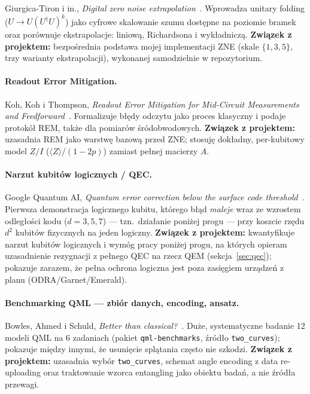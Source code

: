 \documentclass[11pt,a4paper]{article}
\begin{document}
Giurgica-Tiron i in., \emph{Digital zero noise extrapolation}~\cite{giurgica2020}. Wprowadza
unitary folding ($U \to U(U^{\dagger}U)^k$) jako cyfrowe skalowanie szumu dostępne na poziomie
bramek oraz porównuje ekstrapolacje: liniową, Richardsona i wykładniczą. \textbf{Związek
z projektem:} bezpośrednia podstawa mojej implementacji ZNE (skale $\{1,3,5\}$, trzy warianty
ekstrapolacji), wykonanej samodzielnie w repozytorium.

\paragraph{Readout Error Mitigation.}
Koh, Koh i Thompson, \emph{Readout Error Mitigation for Mid-Circuit Measurements and
Feedforward}~\cite{koh2024}. Formalizuje błędy odczytu jako proces klasyczny i podaje protokół
REM, także dla pomiarów
śródobwodowych. \textbf{Związek z projektem:} uzasadnia REM jako warstwę bazową przed ZNE;
stosuję dokładny, per-kubitowy model $Z/I$ ($\langle Z\rangle/(1-2p)$) zamiast pełnej
macierzy $A$.

\paragraph{Narzut kubitów logicznych / QEC.}
Google Quantum AI, \emph{Quantum error correction below the surface code
threshold}~\cite{googleqec2025}. Pierwsza demonstracja logicznego kubitu, którego błąd
\emph{maleje} wraz ze wzrostem odległości kodu ($d=3,5,7$) --- tzn.\ działanie poniżej progu
--- przy koszcie rzędu $d^2$ kubitów fizycznych na jeden logiczny. \textbf{Związek
z projektem:} kwantyfikuje narzut kubitów logicznych i wymóg pracy poniżej progu, na których
opieram uzasadnienie rezygnacji z pełnego QEC na rzecz QEM (sekcja~\ref{sec:qec}); pokazuje
zarazem, że pełna ochrona logiczna jest poza zasięgiem urządzeń z planu (ODRA/Garnet/Emerald).

\paragraph{Benchmarking QML --- zbiór danych, encoding, ansatz.}
Bowles, Ahmed i Schuld, \emph{Better than classical?}~\cite{bowles2024}. Duże, systematyczne
badanie 12 modeli QML na 6 zadaniach (pakiet \texttt{qml-benchmarks}, źródło
\texttt{two\_curves}); pokazuje między innymi, że usunięcie splątania często nie szkodzi.
\textbf{Związek z projektem:} uzasadnia wybór \texttt{two\_curves}, schemat angle encoding
z data re-uploading oraz traktowanie wzorca entangling jako obiektu badań, a nie źródła
przewagi.
\end{document}
